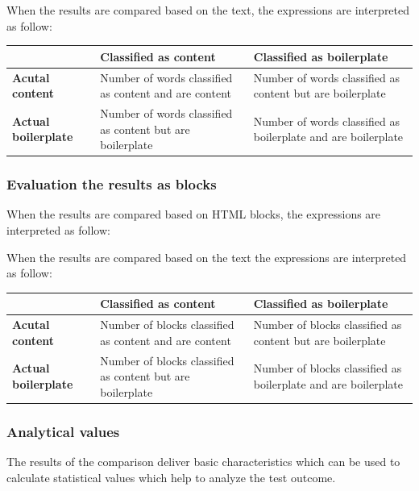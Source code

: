 When the results are compared based on the text, the expressions are interpreted as follow:

 \begin{table}[h]
\begin{tabular}{|p{4cm} |p{5cm} |p{5cm} |}
\hline         								& \textbf{Classified as content} 							& \textbf{Classified as boilerplate} 	\\ \hline
\textbf{Acutal content} 				& Number of words classified as content and are content		& Number of words classified as content but are boilerplate			\\ \hline
\textbf{Actual boilerplate} 			& Number of words classified as content but are boilerplate & Number of words classified as boilerplate and are boilerplate	 	\\ \hline
\end{tabular}
\end{table}

\subsubsection{Evaluation the results as blocks}

When the results are compared based on HTML blocks, the expressions are interpreted as follow:

When the results are compared based on the text the expressions are interpreted as follow:

 \begin{table}[h]
\begin{tabular}{|p{4cm} |p{5cm} |p{5cm} |}
\hline         								& \textbf{Classified as content} 								& \textbf{Classified as boilerplate} 								\\ \hline
\textbf{Acutal content} 				& Number of blocks classified as content and are content		& Number of blocks classified as content but are boilerplate		\\ \hline
\textbf{Actual boilerplate} 			& Number of blocks classified as content but are boilerplate 	& Number of blocks classified as boilerplate and are boilerplate	\\ \hline
\end{tabular}
\end{table}

\subsubsection{Analytical values}

The results of the comparison deliver basic characteristics which can be used to calculate statistical values which help to analyze the test outcome.
										
